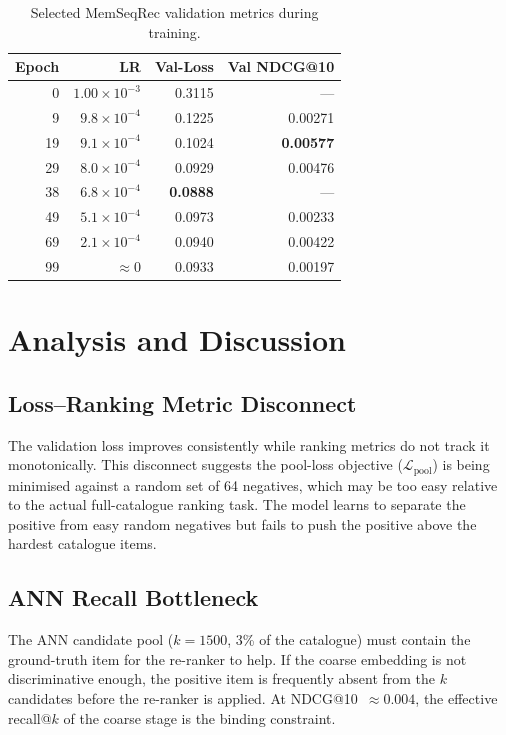 \documentclass[conference]{IEEEtran}
\begin{document}
\begin{table}[h]
\centering
\caption{Selected MemSeqRec validation metrics during training.}
\label{tab:dynamics}
\begin{tabular}{rrrr}
\toprule
\textbf{Epoch} & \textbf{LR} & \textbf{Val-Loss} &
\textbf{Val NDCG@10} \\
\midrule
0   & $1.00 \times 10^{-3}$ & 0.3115 & --- \\
9   & $9.8 \times 10^{-4}$  & 0.1225 & 0.00271 \\
19  & $9.1 \times 10^{-4}$  & 0.1024 & \textbf{0.00577} \\
29  & $8.0 \times 10^{-4}$  & 0.0929 & 0.00476 \\
38  & $6.8 \times 10^{-4}$  & \textbf{0.0888} & --- \\
49  & $5.1 \times 10^{-4}$  & 0.0973 & 0.00233 \\
69  & $2.1 \times 10^{-4}$  & 0.0940 & 0.00422 \\
99  & $\approx 0$            & 0.0933 & 0.00197 \\
\bottomrule
\end{tabular}
\end{table}

\section{Analysis and Discussion}

\subsection{Loss--Ranking Metric Disconnect}

The validation loss improves consistently while ranking metrics
do not track it monotonically.
This disconnect suggests the pool-loss objective ($\mathcal{L}_
{\text{pool}}$) is being minimised against a random set of
64 negatives, which may be too easy relative to the actual
full-catalogue ranking task.
The model learns to separate the positive from easy random
negatives but fails to push the positive above the hardest
catalogue items.

\subsection{ANN Recall Bottleneck}

The ANN candidate pool ($k{=}1500$, 3\% of the catalogue) must
contain the ground-truth item for the re-ranker to help.
If the coarse embedding is not discriminative enough, the positive
item is frequently absent from the $k$ candidates before the
re-ranker is applied.
At NDCG@10~$\approx 0.004$, the effective recall@$k$ of the
coarse stage is the binding constraint.
\end{document}
